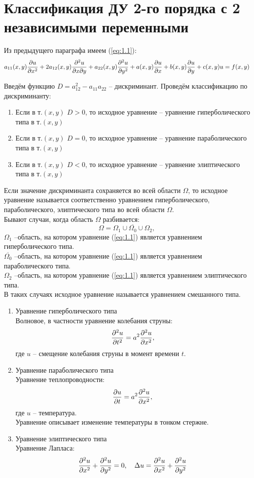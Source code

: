 \documentclass[../main.tex]{subfiles}
\begin{document}
\section{Классификация ДУ 2-го порядка с 2 независимыми переменными}
Из предыдущего параграфа имеем (\ref{eq:1.1}):
\[
	a_{11}(x,y)\frac{\partial u}{\partial x^2} + 2a_{12}(x,y)\frac{\partial ^2u}{\partial x \partial{y}} +
	a_{22}(x,y)\frac{\partial ^2u}{\partial y^2} + a(x,y)\frac{\partial u}{\partial x} + b(x,y)\frac{\partial u}{\partial y} + c(x,y)u = f(x,y)
\]

Введём функцию $D = a_{12}^2-a_{11}a_{22}$ -- дискриминант.
Проведём классификацию по дискриминанту:
\begin{enumerate}
	\item
	      Если в т.$(x,y)$ $D>0$, то исходное уравнение --
	      уравнение гиперболического типа в т.$(x,y)$
	\item
	      Если в т.$(x,y)$ $D=0$, то исходное уравнение --
	      уравнение параболического типа в т.$(x,y)$
	\item
	      Если в т.$(x,y)$ $D<0$, то исходное уравнение --
	      уравнение элиптического типа в т.$(x,y)$
\end{enumerate}

Если значение дискриминанта сохраняется во всей области $\Omega$,
то исходное уравнение называется соответственно уравнением гиперболического,
параболического, элиптического типа во всей области $\Omega$.\\

Бывают случаи, когда область $\Omega$ разбивается:
\[\Omega = \Omega_1 \cup \overline{\Omega_0} \cup \Omega_2, \]
$\Omega_1$ --область, на котором уравнение (\ref{eq:1.1}) является уравнением гиперболического типа.\\
$\overline{\Omega_0}$ --область, на котором уравнение (\ref{eq:1.1}) является уравнением параболического типа.\\
$\Omega_2$ --область, на котором уравнение (\ref{eq:1.1}) является уравнением элиптического типа.\\
В таких случаях исходное уравнение называется уравнением смешанного типа.

\begin{enumerate}
	\item Уравнение гиперболического типа\\
	      Волновое, в частности уравнение колебания струны:
	      \[\frac{\partial ^2u}{\partial t^2}=a^2\frac{\partial ^2u}{\partial x^2},\]
	      где $u$ -- смещение колебания струны в момент времени $t$.
	\item Уравнение параболического типа\\
	      Уравнение теплопроводности:
	      \[\frac{\partial u}{\partial t}=a^2\frac{\partial ^2u}{\partial x^2},\]
	      где $u$ -- температура.\\
	      Уравнение описывает изменение температуры в тонком стержне.
	\item Уравнение элиптического типа\\
	      Уравнение Лапласа:
	      \[
		      \frac{\partial ^2u}{\partial x^2}+\frac{\partial ^2u}{\partial y^2} = 0,\quad
		      \Delta u=\frac{\partial ^2u}{\partial x^2}+\frac{\partial ^2u}{\partial y^2}
	      \]
\end{enumerate}
\end{document}
